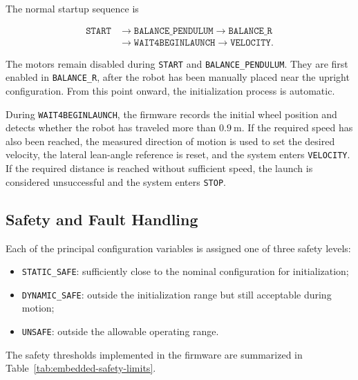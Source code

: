 The normal startup sequence is

\begin{equation}
\begin{aligned}
\texttt{START}
&\longrightarrow
\texttt{BALANCE\_PENDULUM}
\longrightarrow
\texttt{BALANCE\_R}
\\
&\longrightarrow
\texttt{WAIT4BEGINLAUNCH}
\longrightarrow
\texttt{VELOCITY}.
\end{aligned}
\label{eq:state-machine-sequence}
\end{equation}

The motors remain disabled during \texttt{START} and \texttt{BALANCE\_PENDULUM}. They are first enabled in \texttt{BALANCE\_R}, after the robot has been manually placed near the upright configuration. From this point onward, the initialization process is automatic.

During \texttt{WAIT4BEGINLAUNCH}, the firmware records the initial wheel position and detects whether the robot has traveled more than $0.9~\mathrm{m}$. If the required speed has also been reached, the measured direction of motion is used to set the desired velocity, the lateral lean-angle reference is reset, and the system enters \texttt{VELOCITY}. If the required distance is reached without sufficient speed, the launch is considered unsuccessful and the system enters \texttt{STOP}.

\subsection{Safety and Fault Handling}

Each of the principal configuration variables is assigned one of three safety levels:

\begin{itemize}
    \item \texttt{STATIC\_SAFE}: sufficiently close to the nominal configuration for initialization;
    \item \texttt{DYNAMIC\_SAFE}: outside the initialization range but still acceptable during motion;
    \item \texttt{UNSAFE}: outside the allowable operating range.
\end{itemize}

The safety thresholds implemented in the firmware are summarized in Table~\ref{tab:embedded-safety-limits}.

